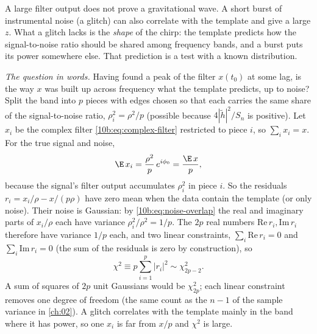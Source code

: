 A large filter output does not prove a gravitational wave. A short burst of instrumental noise (a glitch) can also
correlate with the template and give a large $z$. What a glitch lacks is the \emph{shape} of the chirp: the template
predicts how the signal-to-noise ratio should be shared among frequency bands, and a burst puts its power
somewhere else. That prediction is a test with a known distribution.

\emph{The question in words.} Having found a peak of the filter $x(t_0)$ at some lag, is the way $x$ was built up
across frequency what the template predicts, up to noise? Split the band into $p$ pieces with edges chosen so that
each carries the same share of the signal-to-noise ratio, $\rho_i^2=\rho^2/p$ (possible because $4|\tilde h|^2/S_n$
is positive). Let $x_i$ be the complex filter \eqref{10b:eq:complex-filter} restricted to piece $i$, so
$\sum_ix_i=x$. For the true signal and noise,
\begin{equation}
  \E\,x_i=\frac{\rho^2}{p}\,e^{i\phi_0}=\frac{\E\,x}{p},
\end{equation}
because the signal's filter output accumulates $\rho_i^2$ in piece $i$. So the residuals $r_i=x_i/\rho-x/(p\rho)$ have
zero mean when the data contain the template (or only noise). Their noise is Gaussian: by \eqref{10b:eq:noise-overlap}
the real and imaginary parts of $x_i/\rho$ each have variance $\rho_i^2/\rho^2=1/p$. The $2p$ real numbers
$\mathrm{Re}\,r_i,\mathrm{Im}\,r_i$ therefore have variance $1/p$ each, and two linear constraints, $\sum_i\mathrm{Re}\,r_i=0$ and
$\sum_i\mathrm{Im}\,r_i=0$ (the sum of the residuals is zero by construction), so
\begin{equation}
  \chi^2\equiv p\sum_{i=1}^p|r_i|^2\sim\chi^2_{2p-2}.
  \label{10b:eq:chi2veto}
\end{equation}
A sum of squares of $2p$ unit Gaussians would be $\chi^2_{2p}$; each linear constraint removes one degree of freedom
(the same count as the $n-1$ of the sample variance in \cref{ch:02}). A glitch correlates with the template mainly
in the band where it has power, so one $x_i$ is far from $x/p$ and $\chi^2$ is large.

